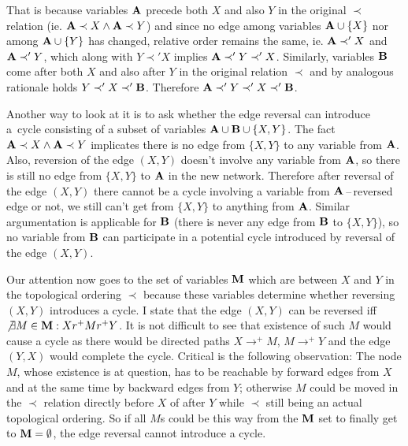 \documentclass[english,cover]{fitthesis} %
\newcommand{\vars}[1]{{\bold{#1}}}         %
\begin{document}
\begin{adjustwidth}{1cm}{0cm}
That is because variables $\vars{A}$ precede both $X$ and also $Y$ in the original $\prec$ relation (ie. $\vars{A} \prec X \land \vars{A} \prec Y$) and since no edge among variables $\vars{A} \cup \lbrace X \rbrace$ nor among $\vars{A} \cup \lbrace Y \rbrace$ has changed, relative order remains the same, ie. $\vars{A} \prec' X$ and $\vars{A} \prec' Y$, which along with $Y \prec' X$ implies $\vars{A} \prec' Y \prec' X$. Similarly, variables $\vars{B}$ come after both $X$ and also after $Y$ in the original relation $\prec$ and by analogous rationale holds $Y \prec' X \prec' \vars{B}$. Therefore $\vars{A} \prec' Y \prec' X \prec' \vars{B}$.
	
Another way to look at it is to ask whether the edge reversal can introduce a~cycle consisting of a subset of variables $\vars{A} \cup \vars{B} \cup \lbrace X,Y \rbrace$. The fact $\vars{A} \prec X \land \vars{A} \prec Y$ implicates there is no edge from $\lbrace X, Y \rbrace$ to any variable from $\vars{A}$. Also, reversion of the edge $(X,Y)$ doesn't involve any variable from $\vars{A}$, so there is still no edge from $\lbrace X,Y \rbrace$ to $\vars{A}$ in the new network. Therefore after reversal of the edge $(X,Y)$ there cannot be a cycle involving a variable from $\vars{A}$\,--\,reversed edge or not, we still can't get from $\lbrace X,Y \rbrace$ to anything from $\vars{A}$. Similar argumentation is applicable for $\vars{B}$ (there is never any edge from $\vars{B}$ to $\lbrace X,Y \rbrace$), so no variable from $\vars{B}$ can participate in a potential cycle introduced by reversal of the edge $(X,Y)$.
\end{adjustwidth}
Our attention now goes to the set of variables $\vars{M}$ which are between $X$ and $Y$ in the topological ordering $\prec$ because these variables determine whether reversing $(X,Y)$ introduces a cycle. I state that the edge $(X,Y)$ can be reversed iff $\not \exists M \in \vars{M}: Xr^+Mr^+Y$. It is not difficult to see that existence of such $M$ would cause a cycle as there would be directed paths $X \rightarrow^+ M$, $M \rightarrow^+ Y$ and the edge $(Y,X)$ would complete the cycle. Critical is the following observation: The node $M$, whose existence is at question, has to be reachable by forward edges from $X$ and at the same time by backward edges from $Y$; otherwise $M$ could be moved in the $\prec$ relation directly before $X$ of after $Y$ while $\prec$ still being an actual topological ordering. So if all $M$s could be this way  from the $\vars{M}$ set to finally get to $\vars{M} = \emptyset$, the edge reversal cannot introduce a cycle.
\end{document}
